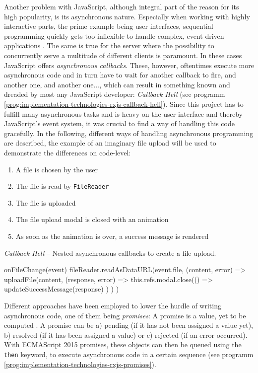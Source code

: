 Another problem with JavaScript, although integral part of the reason for its high popularity, is its asynchronous nature. Especially when working with highly interactive parts, the prime example being user interfaces, sequential programming quickly gets too inflexible to handle complex, event-driven applications \cite{reactive-programming-survey}. The same is true for the server where the possibility to concurrently serve a multitude of different clients is paramount. In these cases JavaScript offers \emph{asynchronous callbacks}. These, however, oftentimes execute more asynchronous code and in turn have to wait for another callback to fire, and another one, and another one..., which can result in something known and dreaded by most any JavaScript developer: \emph{Callback Hell} (see programm \ref{prog:implementation-technologies-rxjs-callback-hell}). Since this project has to fulfill many asynchronous tasks and is heavy on the user-interface and thereby JavaScript's event system, it was crucial to find a way of handling this code gracefully. In the following, different ways of handling asynchronous programming are described, the example of an imaginary file upload will be used to demonstrate the differences on code-level:
\begin{enumerate}
\item A file is chosen by the user
\item The file is read by \texttt{FileReader}
\item The file is uploaded
\item The file upload modal is closed with an animation
\item As soon as the animation is over, a success message is rendered
\end{enumerate}

\begin{program}
\caption{\emph{Callback Hell} -- Nested asynchronous callbacks to create a file upload.}
\label{prog:implementation-technologies-rxjs-callback-hell}
\begin{JsCode}
onFileChange(event) {
  fileReader.readAsDataURL(event.file, (content, error) => {
    uploadFile(content, (response, error) => {
      this.refs.modal.close(() => {
        updateSuccessMessage(response)
      })
    })
  })
}
\end{JsCode}
\end{program}

\noindent Different approaches have been employed to lower the hurdle of writing asynchronous code, one of them being \emph{promises}: A promise is a value, yet to be computed \cite{reactive-vs-promises}. A promise can be a) pending (if it has not been assigned a value yet), b) resolved (if it has been assigned a value) or c) rejected (if an error occurred). With ECMAScript 2015 promises, these objects can then be queued using the \texttt{then} keyword, to execute asynchronous code in a certain sequence (see programm \ref{prog:implementation-technologies-rxjs-promises}).

